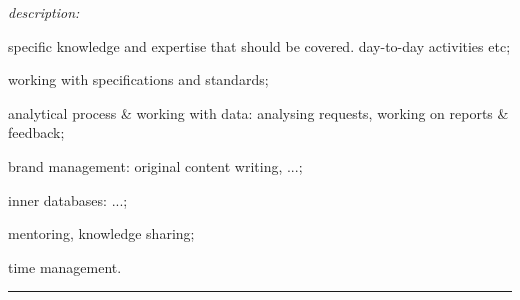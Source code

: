 \documentclass[oneside,final,12pt]{extreport}
\newenvironment{innerlist}{
	\begin{list}{--}{
		\setlength\leftmargin{0.8cm}
		\setlength\partopsep{0pt}
		\setlength\parskip{0pt}
		\setlength\parsep{0pt}
		\setlength\topsep{0pt}
		\setlength\itemsep{0pt}
	}
}{
	\end{list}
}
\begin{document}
         \textsl{description:}
         \begin{innerlist}
	     \item specific knowledge and expertise that should be covered. day-to-day activities etc;
	     \item working with specifications and standards; 
	     \item analytical process \& working with data: analysing requests, working on reports \& feedback;
	     \item brand management: original content writing, ...;  
         \item inner databases: ...;
         \item mentoring, knowledge sharing;
 	     \item time management. 
         \end{innerlist}
\rule{\textwidth}{0.4pt}
\end{document}
